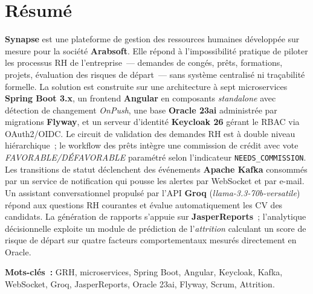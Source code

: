 \documentclass[12pt,a4paper,oneside]{report}
\begin{document}

% 
\cleardoublepage
{}
\setcounter{page}{1}

\chapter*{Résumé}

\textbf{Synapse} est une plateforme de gestion des ressources humaines développée
sur mesure pour la société \textbf{Arabsoft}. Elle répond à l'impossibilité
pratique de piloter les processus RH de l'entreprise~--- demandes de congés,
prêts, formations, projets, évaluation des risques de départ~--- sans système
centralisé ni traçabilité formelle. La solution est construite sur une
architecture à sept microservices \textbf{Spring Boot 3.x}, un frontend
\textbf{Angular} en composants \textit{standalone} avec détection de changement
\textit{OnPush}, une base \textbf{Oracle 23ai} administrée par migrations
\textbf{Flyway}, et un serveur d'identité \textbf{Keycloak 26} gérant le RBAC
via OAuth2/OIDC. Le circuit de validation des demandes RH est à double niveau
hiérarchique~; le workflow des prêts intègre une commission de crédit avec vote
\textit{FAVORABLE/DÉFAVORABLE} paramétré selon l'indicateur \texttt{NEEDS\_COMMISSION}.
Les transitions de statut déclenchent des événements \textbf{Apache Kafka}
consommés par un service de notification qui pousse les alertes par WebSocket
et par e-mail. Un assistant conversationnel propulsé par l'API \textbf{Groq}
(\textit{llama-3.3-70b-versatile}) répond aux questions RH courantes et évalue
automatiquement les CV des candidats. La génération de rapports s'appuie sur
\textbf{JasperReports}~; l'analytique décisionnelle exploite un module de
prédiction de l'\textit{attrition} calculant un score de risque de départ
sur quatre facteurs comportementaux mesurés directement en Oracle.

\bigskip
\noindent\textbf{Mots-clés~:} GRH, microservices, Spring Boot, Angular, Keycloak,
Kafka, WebSocket, Groq, JasperReports, Oracle 23ai, Flyway, Scrum, Attrition.

\cleardoublepage

\tableofcontents\cleardoublepage
\listoffigures{}\cleardoublepage
\listoftables{}\cleardoublepage
\end{document}
